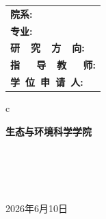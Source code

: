 \begin{center}
	\renewcommand\arraystretch{1.5}
	\begin{tabular}{l}
		{\sihao \bf 院\qquad\qquad 系:} \\
		{\sihao \bf 专\qquad\qquad 业:} \\
		{\sihao \bf 研~~究~~方~~向:}      \\
		{\sihao \bf 指~~~导~~教~~~师:}      \\
		{\sihao \bf 学~位~申~请~人:}
	\end{tabular}
	\begin{tabular}c

		{\sihao \bf  \qquad 生态与环境科学学院 \qquad} \\
		                  \\
		                 \\
		\hline {\sihao \bf ~}                     \\
		\hline {\sihao \bf ~}                     \\


		\hline
	\end{tabular}
\end{center}

\vskip 2.0cm

\begin{center}
	{\sihao 2026年6月10日}
\end{center}

